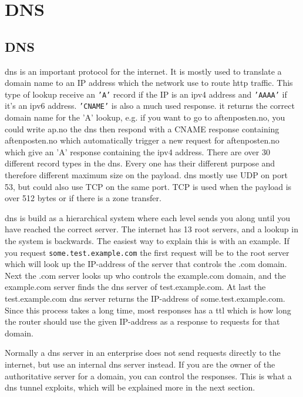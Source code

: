 \chapter{DNS}
\label{chp:dns}

\section{DNS}

\Gls{dns} is an important protocol for the internet. It is mostly used to translate a domain name to an IP address which the network use to route http traffic. This type of lookup receive an \texttt{'A'} record if the IP is an ipv4 address and \texttt{'AAAA'} if it's an ipv6 address. \texttt{'CNAME'} is also a much used response. it returns the correct domain name for the 'A' lookup, e.g. if you want to go to aftenposten.no, you could write ap.no the \Gls{dns} then respond with a CNAME response containing aftenposten.no which automatically trigger a new request for aftenposten.no which give an 'A' response containing the ipv4 address. There are over 30 different record types in the \Gls{dns}. Every one has their different purpose and therefore different maximum size on the payload. \Gls{dns} mostly use UDP on port 53, but could also use TCP on the same port. TCP is used when the payload is over 512 bytes or if there is a zone transfer. 

\Gls{dns} is build as a hierarchical system where each level sends you along until you have reached the correct server. The internet has 13 root servers, and a lookup in the system is backwards. The easiest way to explain this is with an example. If you request \texttt{some.test.example.com} the first request will be to the root server which will look up the IP-address of the server that controls the .com domain. Next the .com server looks up who controls the example.com domain, and the example.com server finds the \Gls{dns} server of test.example.com. At last the test.example.com \Gls{dns} server returns the IP-address of some.test.example.com. Since this process takes a long time, most responses has a \Gls{ttl} which is how long the router should use the given IP-address as a response to requests for that domain.

Normally a \Gls{dns} server in an enterprise does not send requests directly to the internet, but use an internal \Gls{dns} server instead. If you are the owner of the authoritative server for a domain, you can control the responses. This is what a \Gls{dns} tunnel exploits, which will be explained more in the next section. 





 